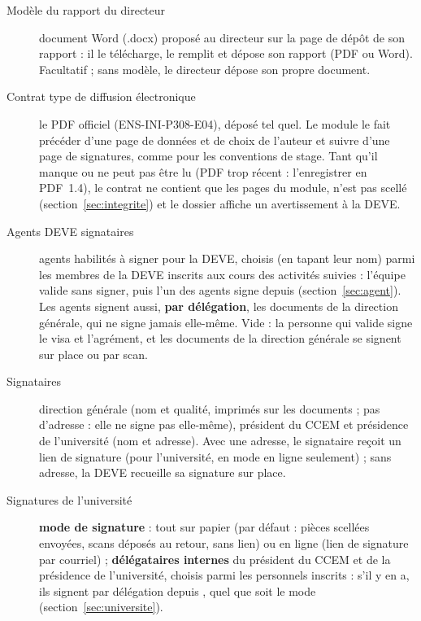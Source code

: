 \documentclass[11pt,a4paper]{article}
\begin{document}
\begin{description}
  \item[Modèle du rapport du directeur] document Word (.docx) proposé au
        directeur sur la page de dépôt de son rapport : il le télécharge, le
        remplit et dépose son rapport (PDF ou Word). Facultatif ; sans modèle,
        le directeur dépose son propre document.
  \item[Contrat type de diffusion électronique] le PDF officiel
        (ENS-INI-P308-E04), déposé tel quel. Le module le fait précéder d'une
        page de données et de choix de l'auteur et suivre d'une page de
        signatures, comme pour les conventions de stage. Tant qu'il manque ou
        ne peut pas être lu (PDF trop récent : l'enregistrer en PDF~1.4), le
        contrat ne contient que les pages du module, n'est pas scellé
        (section~\ref{sec:integrite}) et le dossier affiche un avertissement
        à la DEVE.
  \item[Agents DEVE signataires] agents habilités à signer pour la DEVE,
        choisis (en tapant leur nom) parmi les membres de la DEVE inscrits aux
        cours des activités suivies : l'équipe valide sans signer, puis l'un
        des agents signe depuis 
        (section~\ref{sec:agent}). Les agents signent aussi, \textbf{par
        délégation}, les documents de la direction générale, qui ne signe
        jamais elle-même. Vide : la personne qui valide signe le visa et
        l'agrément, et les documents de la direction générale se signent sur
        place ou par scan.
  \item[Signataires] direction générale (nom et qualité, imprimés sur les
        documents ; pas d'adresse : elle ne signe pas elle-même), président du
        CCEM et présidence de l'université (nom et adresse). Avec une adresse,
        le signataire reçoit un lien de signature (pour l'université, en mode
        \og en ligne\fg{} seulement) ; sans adresse, la DEVE recueille sa
        signature sur place.
  \item[Signatures de l'université] \textbf{mode de signature} : \og tout sur
        papier\fg{} (par défaut : pièces scellées envoyées, scans déposés au
        retour, sans lien) ou \og en ligne\fg{} (lien de signature par
        courriel) ; \textbf{délégataires internes} du président du CCEM et de
        la présidence de l'université, choisis parmi les personnels inscrits :
        s'il y en a, ils signent par délégation depuis , quel que soit le mode (section~\ref{sec:universite}).

\end{description}
\end{document}
